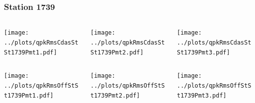 \documentclass[aspectratio=169]{beamer}
\begin{document}
\begin{frame} 
  \frametitle{Station 1739}
  \begin{center}
    \begin{columns}
      \begin{column}{0.33\textwidth}
        \texttt{[image: ../plots/qpkRmsCdasStSt1739Pmt1.pdf]}
      \end{column}
      \begin{column}{0.33\textwidth}
        \texttt{[image: ../plots/qpkRmsCdasStSt1739Pmt2.pdf]}
      \end{column}
      \begin{column}{0.33\textwidth}
        \texttt{[image: ../plots/qpkRmsCdasStSt1739Pmt3.pdf]}
      \end{column}
    \end{columns}
  \end{center}

  \begin{center}
    \begin{columns}
      \begin{column}{0.33\textwidth}
        \texttt{[image: ../plots/qpkRmsOffStSt1739Pmt1.pdf]}
      \end{column}
      \begin{column}{0.33\textwidth}
        \texttt{[image: ../plots/qpkRmsOffStSt1739Pmt2.pdf]}
      \end{column}
      \begin{column}{0.33\textwidth}
        \texttt{[image: ../plots/qpkRmsOffStSt1739Pmt3.pdf]}
      \end{column}
    \end{columns}
  \end{center}
\end{frame}
\end{document}
